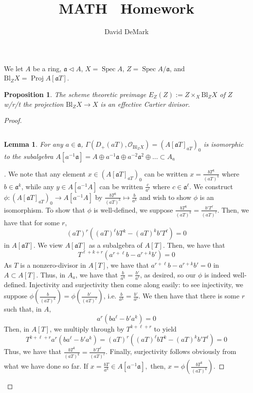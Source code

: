 \documentclass[english,letter,doublesided]{article}
\title{MATH \course~Homework \Roman{hwn}}
\author{David DeMark}
\date{\due}
\DeclareMathOperator{\spec}{Spec}
\newcommand{\OO}{\mathcal{O}}
\newcommand{\afr}{\mathfrak{a}}
\newenvironment{subproof}[1][\proofname]{%
	\renewcommand{\qedsymbol}{$\blacksquare$}%
	\begin{proof}[#1]%
	}{%
	\end{proof}%
}
\newcommand{\prob}[1]{\setcounter{section}{#1-1}\section{}}
\newcommand{\prt}[1]{\setcounter{subsection}{#1-1}\subsection{}}
\newtheorem{lemma}[thm]{Lemma}
\newtheorem*{prop*}{Proposition}
\theoremstyle{remark}
\theoremstyle{definition}
\DeclareMathOperator{\proj}{Proj}
\newcommand{\blo}[2]{\mathrm{Bl}_{#1}{#2}}
\newcommand{\blzx}{\blo{Z}{X}}
\begin{document}
\maketitle
	
	
	\prob{1}We let $A$ be a ring, $\afr \triangleleft A$, $X=\spec A$, $Z=\spec A/\afr$, and $\blzx=\proj A[\afr T]$.
	\begin{prop*}
		The scheme theoretic preimage $E_Z(Z):=Z\times_X \blzx$ of $Z$ w/r/t the projection $\blzx\to X$ is an effective Cartier divisor.
	\end{prop*}\begin{proof}%
	\prt{1}
\begin{lemma}
	For any $a\in \afr$, $\Gamma(D_+(aT), \OO_{\blzx})=(A[\afr T]_{aT})_0$ is isomorphic to the subalgebra $A[a^{-1}\afr]=A\oplus a^{-1}\afr\oplus a^{-2}\afr^2\oplus \dots\subset A_a$
\end{lemma}
\begin{subproof}
We note that any element $x\in(A[\afr T]_{aT})_0$ can be written $x=\frac{bT^k}{(aT)^k}$ where $b\in\afr^k$, while any $y\in A[a^{-1}A]$ can be written $\frac{c}{a^\ell}$ where $c\in \afr^\ell$. We construct $\phi:(A[\afr T]_{aT})_0\to A[a^{-1}A]$ by $\frac{bT^k}{(aT)^k}\mapsto \frac{b}{a^k}$ and wish to show $\phi$ is an isomorphism. To show that $\phi$ is well-defined, we suppose $\frac{bT^k}{(aT)^k}=\frac{b'T^{\ell}}{(aT)^\ell}$. Then, we have that for some $r$, $$(aT)^r\left((aT)^\ell bT^k-(aT)^kb'T^\ell\right)=0$$ in $A[\afr T]$. We view $A[\afr T]$ as a subalgebra of $A[T]$. Then, we have that $$T^{\ell+k+r}\left(a^{r+\ell} b-a^{r+k}b'\right)=0$$
As $T$ is a nonzero-divisor in $A[T]$, we have that $a^{r+\ell} b-a^{r+k}b'=0$ in $A\subset A[T]$. Thus, in $A_a$, we have that $\frac{b}{a^k}=\frac{b'}{a^\ell}$, as desired, so our $\phi$ is indeed well-defined. Injectivity and surjectivity then come along easily: to see injectivity, we suppose $\phi(\frac{b}{(aT)^k})=\phi(\frac{b'}{(aT)^\ell})$, i.e. $\frac{b}{a^k}=\frac{b'}{a^\ell}$. We then have that there is some $r$ such that, in $A$, 
$$a^r(ba^{\ell}-b'a^k)=0$$ Then, in $A[T]$, we multiply through by $T^{k+\ell+r}$ to yield
$$T^{k+\ell+r}a^r(ba^{\ell}-b'a^k)=(aT)^r\left((aT)^\ell bT^k-(aT)^kb'T^\ell\right)=0$$
Thus, we have that $\frac{bT^k}{(aT)^k}=\frac{b'T^{\ell}}{(aT)^\ell}$. Finally, surjectivity follows obviously from what we have done so far. If $x=\frac{bT}{a^k}\in A[a^{-1}\afr],$ then, $x=\phi(\frac{bT^k}{(aT)^k})$.
\end{subproof}

\end{proof}
\end{document}
